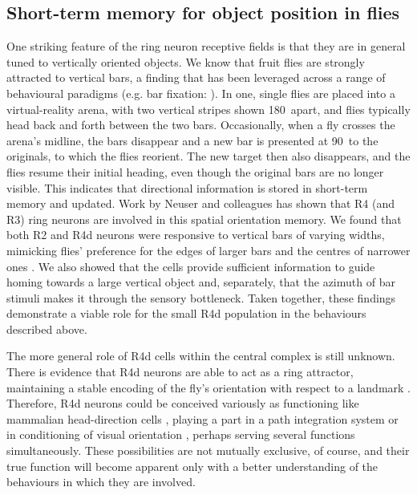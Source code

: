 \subsection*{Short-term memory for object position in flies}
One striking feature of the ring neuron receptive fields is that they are in general tuned to vertically oriented objects. We know that fruit flies are strongly attracted to vertical bars, a finding that has been leveraged across a range of behavioural paradigms (e.g. bar fixation: \cite{Neuser2008}). In one, single flies are placed into a virtual-reality arena, with two vertical stripes shown 180\degree\ apart, and flies typically head back and forth between the two bars. Occasionally, when a fly crosses the arena’s midline, the bars disappear and a new bar is presented at 90\degree\ to the originals, to which the flies reorient. The new target then also disappears, and the flies resume their initial heading, even though the original bars are no longer visible. This indicates that directional information is stored in short-term memory and updated. Work by Neuser and colleagues \cite{Neuser2008} has shown that R4 (and R3) ring neurons are involved in this spatial orientation memory. We found that both R2 and R4d neurons were responsive to vertical bars of varying widths, mimicking flies' preference for the edges of larger bars and the centres of narrower ones \cite{Osorio1990}. We also showed that the cells provide sufficient information to guide homing towards a large vertical object and, separately, that the azimuth of bar stimuli makes it through the sensory bottleneck. Taken together, these findings demonstrate a viable role for the small R4d population in the behaviours described above.

The more general role of R4d cells within the central complex is still unknown.
There is evidence that R4d neurons are able to act as a ring attractor, maintaining a stable encoding of the fly's orientation with respect to a landmark \cite{Seelig2015,Cope2017}.
Therefore, R4d neurons could be conceived variously as functioning like mammalian head-direction cells \cite{Tomchik2008}, playing a part in a path integration system \cite{Neuser2008} or in conditioning of visual orientation \cite{Guo2015}, perhaps serving several functions simultaneously.
These possibilities are not mutually exclusive, of course, and their true function will become apparent only with a better understanding of the behaviours in which they are involved.

